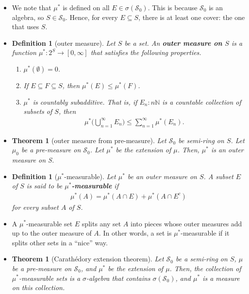 \documentclass[10pt]{article}
\newtheorem{theorem}[lemma]{Theorem}
\newtheorem{definition}[lemma]{Definition}
\numberwithin{lemma}{section}
\newcommand{\mcal}[1]{\mathcal{#1}}
\newcommand{\Nat}{\mathbb{N}}
\begin{document}
\begin{itemize}
  \item We note that $\mu^*$ is defined on all $E \in \sigma(\mcal{S}_0)$. This is because $\mcal{S}_0$ is an algebra, so $S \in \mcal{S}_0$. Hence, for every $E \subseteq S$, there is at least one cover: the one that uses $S$.
  
  \item \begin{definition}[outer measure]
    Let $S$ be a set. An {\bf outer measure on $S$} is a function $\mu^*: 2^S \rightarrow [0,\infty]$ that satisfies the following properties.
    \begin{enumerate}
      \item $\mu^*(\emptyset) = 0$.
      \item If $E \subseteq F \subseteq S$, then $\mu^*(E) \leq \mu^*(F)$.
      \item $\mu^*$ is countably subadditive. That is, if ${E_n : n \Nat}$ is a countable collection of subsets of $S$, then
      \begin{align*}
        \mu^*\bigg( \bigcup_{n=1}^\infty E_n \bigg) \leq \sum_{n=1}^\infty \mu^*(E_n).
      \end{align*}
    \end{enumerate}
  \end{definition}

  \item \begin{theorem}[outer measure from pre-measure]
    Let $\mcal{S}_0$ be semi-ring on $S$. Let $\mu_0$ be a pre-measure on $\mcal{S}_0$. Let $\mu^*$ be the extension of $\mu$. Then, $\mu^*$ is an outer measure on S.
  \end{theorem}

  \item \begin{definition}[$\mu^*$-measurable]
    Let $\mu^*$ be an outer measure on $S$. A subset $E$ of $S$ is said to be {\bf $\mu^*$-measurable} if
    \begin{align*}
      \mu^*(A) = \mu^*(A \cap E) + \mu^*(A \cap E^c)
    \end{align*}
    for every subset $A$ of $S$.
  \end{definition}

  \item A $\mu^*$-measurable set $E$ splits any set $A$ into pieces whose outer measures add up to the outer measure of $A$. In other words, a set is $\mu^*$-measurable if it splits other sets in a ``nice'' way.
    
  \item \begin{theorem}[Carath\'{e}dory extension theorem]
    Let $\mcal{S}_0$ be a semi-ring on $S$, $\mu$ be a pre-measure on $\mcal{S}_0$, and $\mu^*$ be the extension of $\mu$. Then, the collection of $\mu^*$-measurable sets is a $\sigma$-algebra that contains $\sigma(\mcal{S}_0)$, and $\mu^*$ is a measure on this collection.
  \end{theorem}


\end{itemize}
\end{document}
